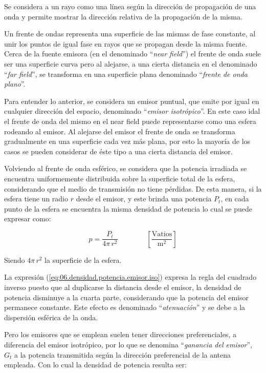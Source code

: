 Se considera a un rayo como una línea seg\'un la dirección de
propagación de una onda y permite mostrar la
dirección relativa de la propagación de la misma.

Un frente de ondas representa una superficie de las mismas de fase
constante, al unir los puntos de igual fase en rayos
que se propagan desde la misma fuente. Cerca de la fuente emisora (en el denominado ``\emph{near field}'')
el frente de onda suele ser una superficie curva pero al alejarse, a una cierta distancia en el denominado ``\emph{far field}'', se transforma en una superficie plana denominado ``\emph{frente de onda plano}''.

Para entender lo anterior, se considera un emisor puntual, que emite por igual en cualquier direcci\'on del espacio,  denominado ``\emph{emisor isotr\'opico}''. En este caso idal 
el frente de onda del mismo en el near field
puede representarse como una esfera rodeando al emisor.
Al alejarse del emisor el frente de onda se transforma gradualmente en una superficie cada vez m\'as plana,
por esto la mayor\'ia de los casos se pueden considerar de \'este tipo a una cierta distancia del emisor.

Volviendo al frente de onda esf\'erico, se considera que la potencia irradiada se encuentra 
uniformemente distribuida sobre la superficie total de la esfera, considerando que el medio de transmisión no
tiene pérdidas.
De esta manera, si la esfera tiene un radio $r$ desde el emisor, y este brinda una potencia $P_t$, 
 en cada punto de la esfera se encuentra la misma densidad de potencia lo cual se puede expresar como:

 \begin{equation}
   \label{eq:06.densidad.potencia.emisor.iso} \displaystyle
   p = \frac{P_t}{4\pi\,r^2} \qquad \qquad  \left[ \frac{\text{Vatios}}{\text{m}^2} \right]
 \end{equation}

Siendo $4\pi\,r^2$ la superficie de la esfera.

La expresi\'on (\ref{eq:06.densidad.potencia.emisor.iso})
expresa la regla del cuadrado inverso puesto que al duplicarse la distancia desde el emisor,
la densidad de potencia disminuye a la cuarta parte, considerando que la potencia del emisor
permanece constante.
Este efecto es denominado ``\emph{atenuaci\'on}'' y se debe a la dispersión esférica de la onda.

Pero los emisores que se emplean suelen tener direcciones preferenciales, a diferencia del emisor isotr\'opico,
por lo que 
se denomina ``\emph{ganancia del emisor}'', $G_t$ a la potencia transmitida seg\'un la 
direcci\'on preferencial de la antena empleada. Con lo cual la densidad de potencia resulta ser:

